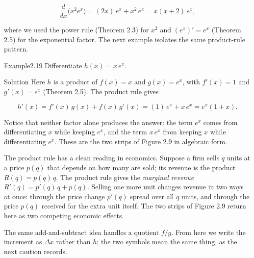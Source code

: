 \documentclass[a4paper,12pt,oneside]{memoir}
\begin{document}
\[ \frac{d}{dx}\bigl(x^{2} e^{x}\bigr) = (2x)\,e^{x} + x^{2}\,e^{x} = x(x + 2)\,e^{x}, \]

where we used the power rule (Theorem 2.3) for \(x^{2}\) and \((e^{x})' = e^{x}\) (Theorem 2.5) for the exponential factor. The next example isolates the same product-rule pattern.

\begin{workedexample}
\begin{envexample}{Example}{2.19}{}
Differentiate \(h(x) = x\,e^{x}\).
\end{envexample}
\begin{envsolution}{Solution}{}{}
Here \(h\) is a product of \(f(x) = x\) and \(g(x) = e^{x}\), with \(f'(x) = 1\) and \(g'(x) = e^{x}\) (Theorem 2.5). The product rule gives

\[ h'(x) = f'(x)\,g(x) + f(x)\,g'(x) = (1)\,e^{x} + x\,e^{x} = e^{x}(1 + x). \]

Notice that neither factor alone produces the answer: the term \(e^{x}\) comes from differentiating \(x\) while keeping \(e^{x}\), and the term \(x\,e^{x}\) from keeping \(x\) while differentiating \(e^{x}\). These are the two strips of Figure 2.9 in algebraic form.
\end{envsolution}
\end{workedexample}
The product rule has a clean reading in economics. Suppose a firm sells \(q\) units at a price \(p(q)\) that depends on how many are sold; its revenue is the product \(R(q) = p(q)\,q\). The product rule gives the \emph{marginal revenue} \(R'(q) = p'(q)\,q + p(q)\). Selling one more unit changes revenue in two ways at once: through the price change \(p'(q)\) spread over all \(q\) units, and through the price \(p(q)\) received for the extra unit itself. The two strips of Figure 2.9 return here as two competing economic effects.

The same add-and-subtract idea handles a quotient \(f/g\). From here we write the increment as \(\Delta x\) rather than \(h\); the two symbols mean the same thing, as the next caution records.
\end{document}

